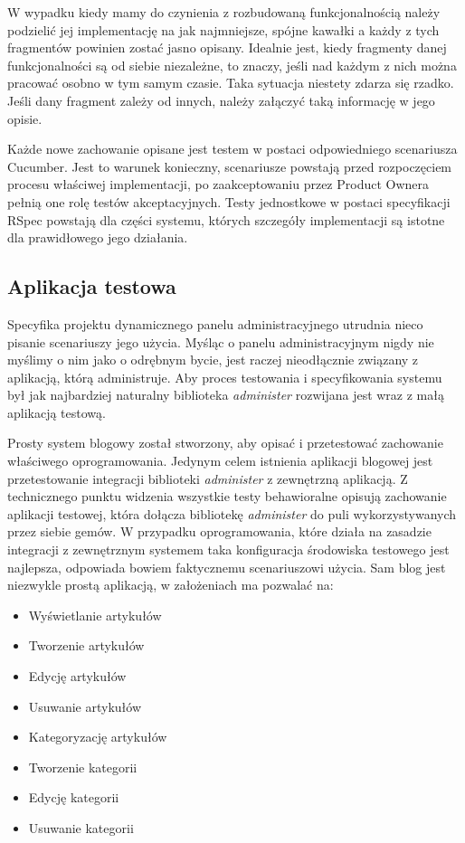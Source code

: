   W wypadku kiedy mamy do czynienia z rozbudowaną funkcjonalnością należy podzielić jej implementację na jak najmniejsze, spójne kawałki a każdy z tych fragmentów powinien zostać jasno opisany. Idealnie jest, kiedy fragmenty danej funkcjonalności są od siebie niezależne, to znaczy, jeśli nad każdym z nich można pracować osobno w tym samym czasie. Taka sytuacja niestety zdarza się rzadko. Jeśli dany fragment zależy od innych, należy załączyć taką informację w jego opisie.
  
  Każde nowe zachowanie opisane jest testem w postaci odpowiedniego scenariusza Cucumber. Jest to warunek konieczny, scenariusze powstają przed rozpoczęciem procesu właściwej implementacji, po zaakceptowaniu przez Product Ownera pełnią one rolę testów akceptacyjnych. Testy jednostkowe w postaci specyfikacji RSpec powstają dla części systemu, których szczegóły implementacji są istotne dla prawidłowego jego działania.
  
  \subsection{Aplikacja testowa}
  Specyfika projektu dynamicznego panelu administracyjnego utrudnia nieco pisanie scenariuszy jego użycia. Myśląc o panelu administracyjnym nigdy nie myślimy o nim jako o odrębnym bycie, jest raczej nieodłącznie związany z aplikacją, którą administruje. Aby proces testowania i specyfikowania systemu był jak najbardziej naturalny biblioteka \emph{administer} rozwijana jest wraz z małą aplikacją testową.
  
  Prosty system blogowy został stworzony, aby opisać i przetestować zachowanie właściwego oprogramowania. Jedynym celem istnienia aplikacji blogowej jest przetestowanie integracji biblioteki \emph{administer} z zewnętrzną aplikacją. Z technicznego punktu widzenia wszystkie testy behawioralne opisują zachowanie aplikacji testowej, która dołącza bibliotekę \emph{administer} do puli wykorzystywanych przez siebie gemów. W przypadku oprogramowania, które działa na zasadzie integracji z zewnętrznym systemem taka konfiguracja środowiska testowego jest najlepsza, odpowiada bowiem faktycznemu scenariuszowi użycia. Sam blog jest niezwykle prostą aplikacją, w założeniach ma pozwalać na:
  
  \begin{itemize}
    \item Wyświetlanie artykułów
    \item Tworzenie artykułów
    \item Edycję artykułów
    \item Usuwanie artykułów
    \item Kategoryzację artykułów
    \item Tworzenie kategorii
    \item Edycję kategorii
    \item Usuwanie kategorii
  \end{itemize}
  
